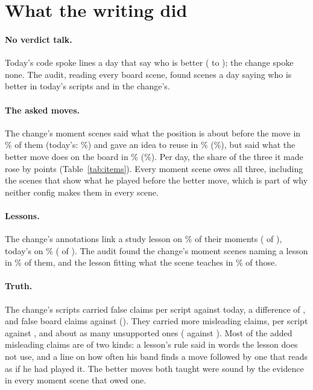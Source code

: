 \documentclass[11pt]{article}
\begin{document}
\section{What the writing did}

\begin{table}[h]
\centering
\small\ItemsTable
\caption{What the audit finds in the moment scenes, pooled over the \Days{} days: the share of the
scenes that owe an item and make it, with the number owing it in brackets.}
\label{tab:items}
\end{table}

\paragraph{No verdict talk.} Today's code spoke \BaseVerdictLines{} lines a day that say who is
better (\BaseVerdictMin{} to \BaseVerdictMax); the change spoke none. The audit, reading every board
scene, found \BaseVerdictScenes{} scenes a day saying who is better in today's scripts and
\CandVerdictScenes{} in the change's.

\paragraph{The asked moves.} The change's moment scenes said what the position is about before
the move in \CandAboutFirst\% of them (today's: \BaseAboutFirst\%) and gave an idea to reuse in
\CandTakeaway\% (\BaseTakeaway\%), but said what the better move does on the board in
\CandPurposeNamed\% (\BasePurposeNamed\%). Per day, the share of the three it made rose by
\AskedDiff{} points (Table~\ref{tab:items}). Every moment scene owes all three, including the scenes
that show what he played before the better move, which is part of why neither config makes them in
every scene.

\paragraph{Lessons.} The change's annotations link a study lesson on \CandLinked\% of their moments
(\CandLinkedN{} of \CandMomentsN), today's on \BaseLinked\% (\BaseLinkedN{} of \BaseMomentsN). The audit
found the change's moment scenes naming a lesson in \CandLessonNamed\% of them, and the lesson
fitting what the scene teaches in \CandLessonFits\% of those.

\paragraph{Truth.} The change's scripts carried \CandFalse{} false claims per script against
\BaseFalse{} today, a difference of \FalseDiff, and \CandBoardFalse{} false board claims against
\BaseBoardFalse{} (\BoardDiff). They carried more misleading claims, \CandMisleading{} per script
against \BaseMisleading, and about as many unsupported ones (\CandUnsupported{} against
\BaseUnsupported). Most of the added misleading claims are of two kinds: a lesson's rule said in
words the lesson does not use, and a line on how often his band finds a move followed by one that
reads as if he had played it. The better moves both
taught were sound by the evidence in every moment scene that owed one.
\end{document}

